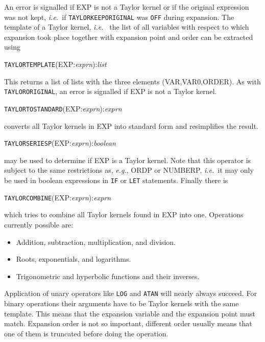 An error is signalled if EXP is not a Taylor kernel or if the original
expression was not kept, {\em i.e.\ }if \verb|TAYLORKEEPORIGINAL| was
\verb|OFF| during expansion.  The template of a Taylor kernel, {\em i.e.\ }
the list of all variables with respect to which expansion took place
together with expansion point and order can be extracted using

\hspace*{2em} {\tt TAYLORTEMPLATE}(EXP:{\em exprn}):{\em list}

This returns a list of lists with the three elements (VAR,VAR0,ORDER).
As with \verb|TAYLORORIGINAL|, an error is signalled if EXP is not a
Taylor kernel. 

\hspace*{2em} {\tt TAYLORTOSTANDARD}(EXP:{\em exprn}):{\em exprn}

converts all Taylor kernels in EXP into standard form and
 resimplifies the result.

\hspace*{2em} {\tt TAYLORSERIESP}(EXP:{\em exprn}):{\em boolean}

may be used to determine if EXP is a Taylor kernel.
 Note that this operator is subject to the same
restrictions as, {\em e.g.}, ORDP or NUMBERP, {\em i.e.\ }it may only be used in
boolean expressions in \verb|IF| or \verb|LET| statements.  Finally
there is

\hspace*{2em} {\tt TAYLORCOMBINE}(EXP:{\em exprn}):{\em exprn}

which tries to combine all Taylor kernels found in EXP into one.
Operations currently possible are:
\begin{itemize}
  \item Addition, subtraction, multiplication, and division.
  \item Roots, exponentials, and logarithms.
  \item Trigonometric and hyperbolic functions and their inverses.
\end{itemize}
Application of unary operators like \verb|LOG| and \verb|ATAN| will
nearly always succeed.  For binary operations their arguments have to be
Taylor kernels with the same template.  This means that the expansion
variable and the expansion point must match. Expansion order is not so
important, different order usually means that one of them is truncated
before doing the operation.

